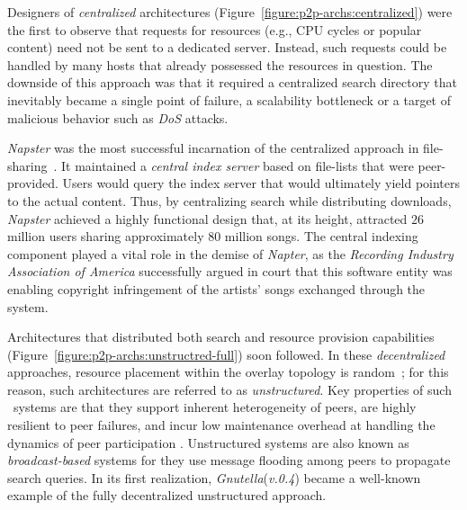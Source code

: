 Designers of \emph{centralized} architectures 
(Figure~\ref{figure:p2p-archs:centralized}) were the first 
to observe that requests for resources
(e.g., CPU cycles or popular content) need not be sent to
a dedicated server. Instead, such requests could be handled by 
many hosts that already possessed the resources in question. 
The downside of this approach was that it required a 
centralized search directory that inevitably became 
a single point of failure, a scalability bottleneck or 
a target of malicious behavior such as \emph{DoS} attacks.

{\sl Napster} was the most successful incarnation of the
centralized approach in file-sharing~\cite{napster}.
It maintained a \emph{central index server} based on file-lists 
that were peer-provided.
Users would query the index server that would ultimately 
yield pointers to the actual content.
Thus, by centralizing search while distributing downloads,  {\sl Napster}
achieved a highly functional design that, at its height, attracted $26$ million
users sharing approximately $80$ million songs\cite{jmm_naptopusage_2001}.
The central indexing component played a vital role in the demise of 
{\sl Napter}, as the \emph{Recording
Industry Association of America} successfully argued in court that this software
entity was enabling copyright infringement of the artists' songs exchanged
through the system.

Architectures that distributed both search and resource provision 
capabilities (Figure~\ref{figure:p2p-archs:unstructred-full}) soon followed.
In these \emph{decentralized} approaches, 
resource placement within the overlay topology is random~\cite{YG-M2002};
for this reason, such architectures are referred to as \emph{unstructured}. 
Key properties of such \p\ systems are that they support inherent heterogeneity
of peers, are highly resilient to peer failures, and incur low maintenance
overhead at handling the dynamics of peer participation
\cite{stutzbach_churn_2006}. 
Unstructured systems are also known as 
\emph{broadcast-based} systems for they use message flooding among %
peers to propagate search queries. 
In its first realization,
{\sl Gnutella}(\emph{v.0.4}) became a well-known example of the fully
decentralized unstructured approach.

